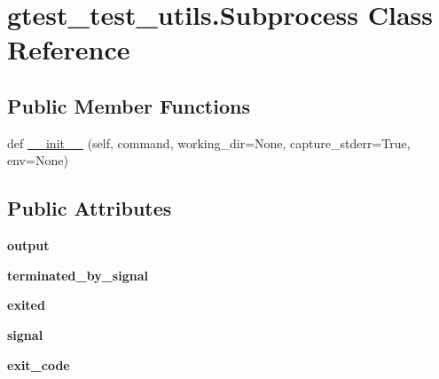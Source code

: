 \hypertarget{classgtest__test__utils_1_1Subprocess}{}\section{gtest\+\_\+test\+\_\+utils.\+Subprocess Class Reference}
\label{classgtest__test__utils_1_1Subprocess}
\subsection*{Public Member Functions}
\begin{DoxyCompactItemize}
\item 
def \hyperlink{classgtest__test__utils_1_1Subprocess_a452a9e7d9988cc96e71b6fa09bbaddca}{\+\_\+\+\_\+init\+\_\+\+\_\+} (self, command, working\+\_\+dir=None, capture\+\_\+stderr=True, env=None)
\end{DoxyCompactItemize}
\subsection*{Public Attributes}
\begin{DoxyCompactItemize}
\item 
{\bfseries output}\hypertarget{classgtest__test__utils_1_1Subprocess_a170f722b867e51f3e97b5b60399988cf}{}\label{classgtest__test__utils_1_1Subprocess_a170f722b867e51f3e97b5b60399988cf}

\item 
{\bfseries terminated\+\_\+by\+\_\+signal}\hypertarget{classgtest__test__utils_1_1Subprocess_a9654b9eddd43c93acf66d5c7b0026fca}{}\label{classgtest__test__utils_1_1Subprocess_a9654b9eddd43c93acf66d5c7b0026fca}

\item 
{\bfseries exited}\hypertarget{classgtest__test__utils_1_1Subprocess_a020b5fa8268b9eaf1c4a57cbd53c104d}{}\label{classgtest__test__utils_1_1Subprocess_a020b5fa8268b9eaf1c4a57cbd53c104d}

\item 
{\bfseries signal}\hypertarget{classgtest__test__utils_1_1Subprocess_af083cd9621a5d5346ffe800191678ea3}{}\label{classgtest__test__utils_1_1Subprocess_af083cd9621a5d5346ffe800191678ea3}

\item 
{\bfseries exit\+\_\+code}\hypertarget{classgtest__test__utils_1_1Subprocess_a01acee4476fd01ccf017d1351cf46c08}{}\label{classgtest__test__utils_1_1Subprocess_a01acee4476fd01ccf017d1351cf46c08}

\end{DoxyCompactItemize}


